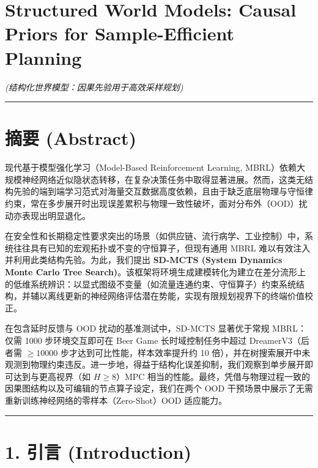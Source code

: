 \documentclass[UTF8]{ctexart}
\date{}
\begin{document}
\hypertarget{structured-world-models-causal-priors-for-sample-efficient-planning}{%
\section{Structured World Models: Causal Priors for Sample-Efficient
Planning}\label{structured-world-models-causal-priors-for-sample-efficient-planning}}

\emph{(结构化世界模型：因果先验用于高效采样规划)}

\begin{center}\rule{0.5\linewidth}{0.4pt}\end{center}

\hypertarget{ux6458ux8981-abstract}{%
\section{摘要 (Abstract)}\label{ux6458ux8981-abstract}}

现代基于模型强化学习（Model-Based Reinforcement Learning, MBRL）依赖大规模神经网络近似隐状态转移，在复杂决策任务中取得显著进展。然而，这类无结构先验的端到端学习范式对海量交互数据高度依赖，且由于缺乏底层物理与守恒律约束，常在多步展开时出现误差累积与物理一致性破坏，面对分布外（OOD）扰动亦表现出明显退化。

在安全性和长期稳定性要求突出的场景（如供应链、流行病学、工业控制）中，系统往往具有已知的宏观拓扑或不变的守恒算子，但现有通用 MBRL 难以有效注入并利用此类结构先验。为此，我们提出 \textbf{SD-MCTS (System Dynamics Monte Carlo Tree Search)}。该框架将环境生成建模转化为建立在差分流形上的低维系统辨识：以显式图级不变量（如流量连通约束、守恒算子）约束系统结构，并辅以离线更新的神经网络评估潜在势能，实现有限规划视界下的终端价值校正。

在包含延时反馈与 OOD 扰动的基准测试中，SD-MCTS 显著优于常规 MBRL：仅需 1000 步环境交互即可在 Beer Game 长时域控制任务中超过 DreamerV3（后者需 $\ge 10000$ 步才达到可比性能，样本效率提升约 10 倍），并在树搜索展开中未观测到物理约束违反。进一步地，得益于结构化误差抑制，我们观察到单步展开即可达到与更高视界（如 $H \ge 8$）MPC 相当的性能。最终，凭借与物理过程一致的因果图结构以及可编辑的节点算子设定，我们在两个 OOD 干预场景中展示了无需重新训练神经网络的零样本（Zero-Shot）OOD 适应能力。


\begin{center}\rule{0.5\linewidth}{0.4pt}\end{center}

\hypertarget{sec-introduction}{%
\section{1. 引言 (Introduction)}\label{sec-introduction}}
\end{document}
